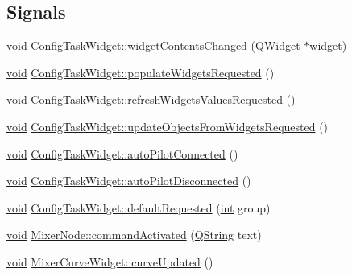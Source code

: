 \subsection*{Signals}
\begin{DoxyCompactItemize}
\item 
\hyperlink{group___u_a_v_objects_plugin_ga444cf2ff3f0ecbe028adce838d373f5c}{void} \hyperlink{group___u_a_v_object_widget_utils_gaee198ff7978d5358a93395eb215fa767}{Config\-Task\-Widget\-::widget\-Contents\-Changed} (Q\-Widget $\ast$widget)
\item 
\hyperlink{group___u_a_v_objects_plugin_ga444cf2ff3f0ecbe028adce838d373f5c}{void} \hyperlink{group___u_a_v_object_widget_utils_gacc1be196d23d5e483f68a990d8ebfae6}{Config\-Task\-Widget\-::populate\-Widgets\-Requested} ()
\item 
\hyperlink{group___u_a_v_objects_plugin_ga444cf2ff3f0ecbe028adce838d373f5c}{void} \hyperlink{group___u_a_v_object_widget_utils_ga6d4f37af17f3990fd37e9eddbb8f3802}{Config\-Task\-Widget\-::refresh\-Widgets\-Values\-Requested} ()
\item 
\hyperlink{group___u_a_v_objects_plugin_ga444cf2ff3f0ecbe028adce838d373f5c}{void} \hyperlink{group___u_a_v_object_widget_utils_gae43eee3bcf829dcfc91b17c25bc5db95}{Config\-Task\-Widget\-::update\-Objects\-From\-Widgets\-Requested} ()
\item 
\hyperlink{group___u_a_v_objects_plugin_ga444cf2ff3f0ecbe028adce838d373f5c}{void} \hyperlink{group___u_a_v_object_widget_utils_ga6812138654a8b49e72c674cee7245781}{Config\-Task\-Widget\-::auto\-Pilot\-Connected} ()
\item 
\hyperlink{group___u_a_v_objects_plugin_ga444cf2ff3f0ecbe028adce838d373f5c}{void} \hyperlink{group___u_a_v_object_widget_utils_gab874b1ad732a19472dc1a9d29f23d7ae}{Config\-Task\-Widget\-::auto\-Pilot\-Disconnected} ()
\item 
\hyperlink{group___u_a_v_objects_plugin_ga444cf2ff3f0ecbe028adce838d373f5c}{void} \hyperlink{group___u_a_v_object_widget_utils_ga42fb0be146f76a7ce2ef34e655a3015a}{Config\-Task\-Widget\-::default\-Requested} (\hyperlink{ioapi_8h_a787fa3cf048117ba7123753c1e74fcd6}{int} group)
\item 
\hyperlink{group___u_a_v_objects_plugin_ga444cf2ff3f0ecbe028adce838d373f5c}{void} \hyperlink{group___u_a_v_object_widget_utils_ga942a3a9bcc32e276d18b155ef73298f1}{Mixer\-Node\-::command\-Activated} (\hyperlink{group___u_a_v_objects_plugin_gab9d252f49c333c94a72f97ce3105a32d}{Q\-String} text)
\item 
\hyperlink{group___u_a_v_objects_plugin_ga444cf2ff3f0ecbe028adce838d373f5c}{void} \hyperlink{group___u_a_v_object_widget_utils_ga90255ec9acd8db01306ae5f9af229f39}{Mixer\-Curve\-Widget\-::curve\-Updated} ()

\end{DoxyCompactItemize}
